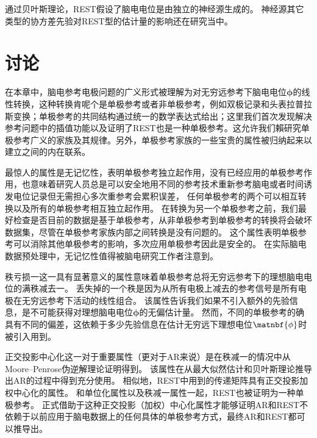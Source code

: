 通过贝叶斯理论，REST假设了脑电电位是由独立的神经源生成的。 神经源其它类型的协方差先验对REST型的估计量的影响还在研究当中。 
\section{讨论}
在本章中，脑电参考电极问题的广义形式被理解为对无穷远参考下脑电电位$\mathbf{\phi}$的线性转换，这种转换肯呢个是单极参考或者非单极参考，例如双极记录和头表拉普拉斯变换；单极参考的共同结构通过统一的数学表达式给出；这里我们首次发现解决参考问题中的插值功能以及证明了REST也是一种单极参考。这允许我们賴研究单极参考广义的家族及其规律。另外，单极参考家族的一些宝贵的属性被归纳起来以建立之间的内在联系。 

最惊人的属性是无记忆性，表明单极参考独立起作用，没有已经应用的单极参考作用，也意味着研究人员总是可以安全地用不同的参考技术重新参考脑电或者时间诱发电位记录但无需担心多次重参考会累积误差， 任何单极参考的两个可以相互转换以及所有的单极参考相互独立起作用。 在转换为另一个单极参考之前，我们最好检查是否目前的数据是基于单极参考，从非单极参考到单极参考的转换将会破坏数据集，尽管在单极参考家族内部之间转换是没有问题的。 这个属性表明单极参考可以消除其他单极参考的影响，多次应用单极参考因此是安全的。 在实际脑电数据预处理中，无记忆性值得被脑电研究工作者注意到。

秩亏损一这一具有显著意义的属性意味着单极参考总将无穷远参考下的理想脑电电位的满秩减去一。 丢失掉的一个秩是因为从所有电极上减去的参考信号是所有电极在无穷远参考下活动的线性组合。 该属性告诉我们如果不引入额外的先验信息，是不可能获得对理想脑电电位$\mathbf{\phi}$的无偏估计量。 然而，不同的单极参考的确具有不同的偏差，这依赖于多少先验信息在估计无穷远下理想电位$\matnbf{\phi}$时被引入用到。

正交投影中心化这一对于重要属性（更对于AR来说）是在秩减一的情况中从Moore–Penrose伪逆解理论证明得到。 该属性在从最大似然估计和贝叶斯理论推导出AR的过程中得到充分使用。 相似地，REST中用到的传递矩阵具有正交投影加权中心化的属性。 和单位化属性以及秩减一属性一起，REST也被证明为一种单极参考。 正式借助于这种正交投影（加权）中心化属性才能够证明AR和REST不依赖于以前应用于脑电数据上的任何具体的单极参考方式，最终AR和REST都可以推导出。

